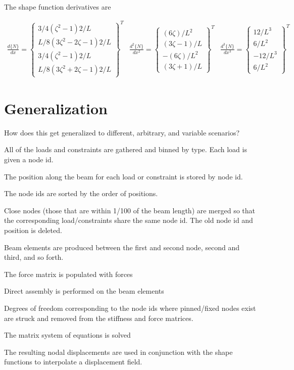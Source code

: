 \documentclass[10pt,letterpaper]{article}
\begin{document}
	The shape function derivatives are

	\begin{align}
		\frac{d \{N\}}{d x}     =
		\begin{Bmatrix}
				3/4 (\zeta^2-1) 2/L \\
				L/8 (3 \zeta^2-2 \zeta - 1) 2/L \\
			    3/4 (\zeta^2-1) 2/L \\
				L/8 (3 \zeta^2+2 \zeta -1) 2/L
		\end{Bmatrix}^T &
		\frac{d^2 \{N\}}{d x^2} =
		\begin{Bmatrix}
				(6 \zeta)/L^2 \\
				(3 \zeta-1)/L \\
			   -(6 \zeta)/L^2 \\
				(3 \zeta+1)/L
		\end{Bmatrix}^T &
		\frac{d^3 \{N\}}{d x^3} =
		\begin{Bmatrix}
				12/L^3 \\
				6/L^2 \\
			   -12/L^3 \\
				6/L^2
		\end{Bmatrix}^T 
	\end{align}

	\section{Generalization}
	How does this get generalized to different, arbitrary, and variable scenarios?

	\begin{asparaitem}
		\item All of the loads and constraints are gathered and binned by type. Each load is given a node id.
		\item The position along the beam for each load or constraint is stored by node id.
		\item The node ids are sorted by the order of positions.
		\item Close nodes (those that are within 1/100 of the beam length) are merged so that the corresponding load/constraints share the same node id. The old node id and position is deleted.
		\item Beam elements are produced between the first and second node, second and third, and so forth.
		\item The force matrix is populated with forces
		\item Direct assembly is performed on the beam elements
		\item Degrees of freedom corresponding to the node ids where pinned/fixed nodes exist are struck and removed from the stiffness and force matrices.
		\item The matrix system of equations is solved
		\item The resulting nodal displacements are used in conjunction with the shape functions to interpolate a displacement field.
	\end{asparaitem}
\end{document}
